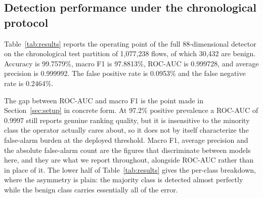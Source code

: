 \documentclass{ieeeaccess}
\begin{document}
\subsection{Detection performance under the chronological protocol}
\label{sec:chrono}
Table~\ref{tab:results} reports the operating point of the full 88-dimensional detector on the chronological test partition of 1,077,238 flows, of which 30,432 are benign. Accuracy is 99.7579\%, macro F1 is 97.8813\%, ROC-AUC is 0.999728, and average precision is 0.999992. The false positive rate is 0.0953\% and the false negative rate is 0.2464\%.

The gap between ROC-AUC and macro F1 is the point made in Section~\ref{sec:setup} in concrete form. At 97.2\% positive prevalence a ROC-AUC of 0.9997 still reports genuine ranking quality, but it is insensitive to the minority class the operator actually cares about, so it does not by itself characterize the false-alarm burden at the deployed threshold. Macro F1, average precision and the absolute false-alarm count are the figures that discriminate between models here, and they are what we report throughout, alongside ROC-AUC rather than in place of it. The lower half of Table~\ref{tab:results} gives the per-class breakdown, where the asymmetry is plain: the majority class is detected almost perfectly while the benign class carries essentially all of the error.
\end{document}
